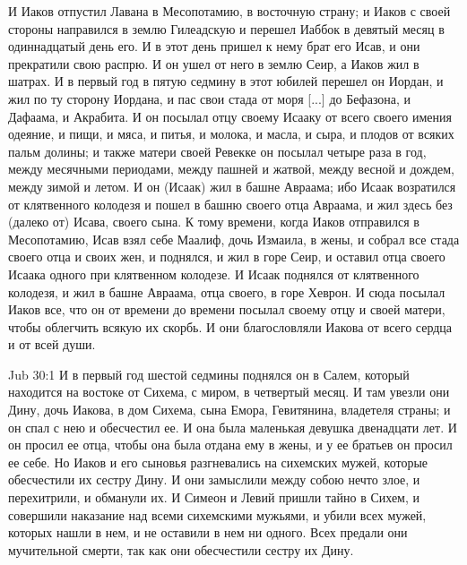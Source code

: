 И Иаков отпустил Лавана в Месопотамию, в
восточную страну; и Иаков с своей стороны
направился в землю Гилеадскую и перешел Иаббок в
девятый месяц в одиннадцатый день его. И в этот
день пришел к нему брат его Исав, и они прекратили
свою распрю. И он ушел от него в землю Сеир, а
Иаков жил в шатрах. И в первый год в пятую седмину
в этот юбилей перешел он Иордан, и жил по ту
сторону Иордана, и пас свои стада от моря [...] до
Бефазона, и Дафаама, и Акрабита. И он посылал отцу
своему Исааку от всего своего имения одеяние, и
пищи, и мяса, и питья, и молока, и масла, и сыра, и
плодов от всяких пальм долины; и также матери своей
Ревекке он посылал четыре раза в год, между
месячными периодами, между пашней и жатвой, между
весной и дождем, между зимой и летом. И он (Исаак)
жил в башне Авраама; ибо Исаак возратился от
клятвенного колодезя и пошел в башню своего отца
Авраама, и жил здесь без (далеко от) Исава, своего
сына. К тому времени, когда Иаков отправился в
Месопотамию, Исав взял себе Маалиф, дочь Измаила,
в жены, и собрал все стада своего отца и своих жен,
и поднялся, и жил в горе Сеир, и оставил отца
своего Исаака одного при клятвенном колодезе. И
Исаак поднялся от клятвенного колодезя, и жил в
башне Авраама, отца своего, в горе Хеврон. И сюда
посылал Иаков все, что он от времени до времени
посылал своему отцу и своей матери, чтобы
облегчить всякую их скорбь. И они
благословляли Иакова от всего сердца и от всей
души.

\vs Jub 30:1
И в первый год шестой седмины поднялся он в
Салем, который находится на востоке от Сихема, с
миром, в четвертый месяц. И там увезли они Дину,
дочь Иакова, в дом Сихема, сына Емора, Гевитянина,
владетеля страны; и он спал с нею и обесчестил ее.
И она была маленькая девушка двенадцати лет. И он
просил ее отца, чтобы она была отдана ему в жены, и
у ее братьев он просил ее себе. Но Иаков и его
сыновья разгневались на сихемских мужей, которые
обесчестили их сестру Дину. И они замыслили между
собою нечто злое, и перехитрили, и обманули их. И
Симеон и Левий пришли тайно в Сихем, и совершили
наказание над всеми сихемскими мужьями, и убили
всех мужей, которых нашли в нем, и не оставили в
нем ни одного. Всех предали они мучительной
смерти, так как они обесчестили сестру их Дину.

